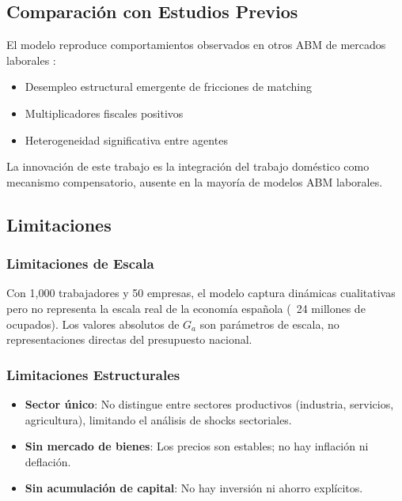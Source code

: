 \subsection{Comparación con Estudios Previos}

El modelo reproduce comportamientos observados en otros ABM de mercados laborales \cite{fagiolo2004, dawid2012eurace, dosi2010}:
\begin{itemize}
    \item Desempleo estructural emergente de fricciones de matching
    \item Multiplicadores fiscales positivos
    \item Heterogeneidad significativa entre agentes
\end{itemize}

La innovación de este trabajo es la integración del trabajo doméstico como mecanismo compensatorio, ausente en la mayoría de modelos ABM laborales.

\subsection{Limitaciones}

\subsubsection{Limitaciones de Escala}

Con 1,000 trabajadores y 50 empresas, el modelo captura dinámicas cualitativas pero no representa la escala real de la economía española (~24 millones de ocupados). Los valores absolutos de $G_a$ son parámetros de escala, no representaciones directas del presupuesto nacional.

\subsubsection{Limitaciones Estructurales}

\begin{itemize}
    \item \textbf{Sector único}: No distingue entre sectores productivos (industria, servicios, agricultura), limitando el análisis de shocks sectoriales.
    \item \textbf{Sin mercado de bienes}: Los precios son estables; no hay inflación ni deflación.
    \item \textbf{Sin acumulación de capital}: No hay inversión ni ahorro explícitos.
\end{itemize}

